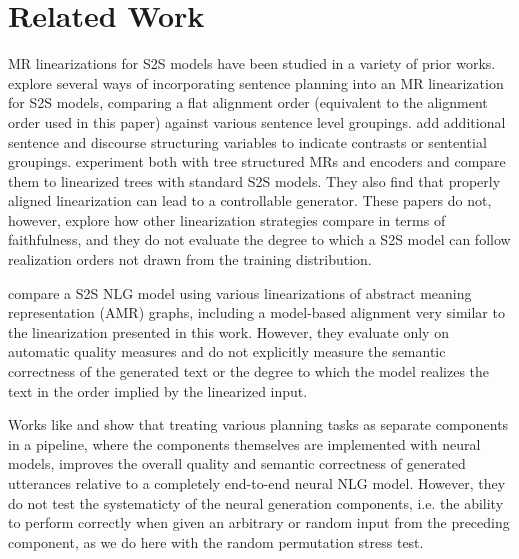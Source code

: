 \section{Related Work}
\label{sec:relatedwork}

MR linearizations for S2S models have been studied in a
variety of prior works. \citet{nayak2017} explore several ways of incorporating
sentence planning into an MR linearization for S2S models, comparing a flat
alignment order (equivalent to the alignment order used in this paper)
against various sentence level groupings.  \citet{reed2018} add additional
sentence and discourse structuring variables to indicate contrasts or
sentential groupings.  \citet{balakrishnan2019} experiment
both with tree structured MRs and encoders and compare them to linearized trees
with standard S2S models. They also find that properly
aligned linearization can lead to a controllable generator.
These papers do not, however, explore how other linearization
strategies compare in terms of faithfulness, and they do not evaluate the
degree to which a S2S model can follow realization orders not drawn from the
training distribution.

\citet{castroferreira2017} compare a S2S NLG model using various
linearizations of abstract meaning representation (AMR) graphs, including a
model-based alignment very similar to the  linearization presented
in this work. However, they evaluate only on automatic quality measures and do
not explicitly measure the semantic correctness of the generated text or the
degree to which the model realizes the text in the order implied by the
linearized input.

Works like \citet{moryossef2019a,moryossef2019b} and
\citet{castroferreira2019} show that treating various planning tasks as
separate components in a pipeline, where the components themselves are
implemented with neural models, improves the overall quality and semantic
correctness of generated utterances relative to a completely end-to-end neural
NLG model. However, they do not test the systematicty of the neural generation
components, i.e. the ability to perform correctly when given an arbitrary or
random input from the preceding component, as we do here with the random
permutation stress test.%


%



